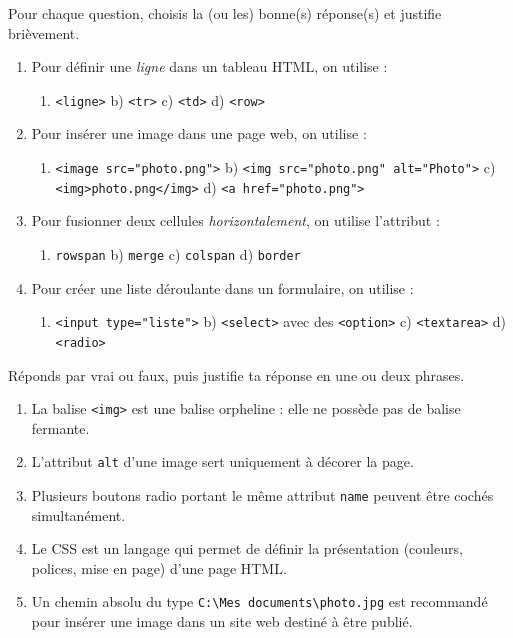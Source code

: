 \documentclass[11pt]{article}
\begin{document}
\begin{exercice}
Pour chaque question, choisis la (ou les) bonne(s) réponse(s) et justifie brièvement.
\begin{enumerate}
  \item Pour définir une \emph{ligne} dans un tableau HTML, on utilise :
  \begin{enumerate}
    \item \texttt{<ligne>} \quad b) \texttt{<tr>} \quad c) \texttt{<td>} \quad d) \texttt{<row>}
  \end{enumerate}
  \item Pour insérer une image dans une page web, on utilise :
  \begin{enumerate}
    \item \texttt{<image src="photo.png">} \quad b) \texttt{<img src="photo.png" alt="Photo">} \quad c) \texttt{<img>photo.png</img>} \quad d) \texttt{<a href="photo.png">}
  \end{enumerate}
  \item Pour fusionner deux cellules \emph{horizontalement}, on utilise l'attribut :
  \begin{enumerate}
    \item \texttt{rowspan} \quad b) \texttt{merge} \quad c) \texttt{colspan} \quad d) \texttt{border}
  \end{enumerate}
  \item Pour créer une liste déroulante dans un formulaire, on utilise :
  \begin{enumerate}
    \item \texttt{<input type="liste">} \quad b) \texttt{<select>} avec des \texttt{<option>} \quad c) \texttt{<textarea>} \quad d) \texttt{<radio>}
  \end{enumerate}
\end{enumerate}
\end{exercice}

\begin{exercice}
Réponds par vrai ou faux, puis justifie ta réponse en une ou deux phrases.
\begin{enumerate}
  \item La balise \texttt{<img>} est une balise orpheline : elle ne possède pas de balise fermante.
  \item L'attribut \texttt{alt} d'une image sert uniquement à décorer la page.
  \item Plusieurs boutons radio portant le même attribut \texttt{name} peuvent être cochés simultanément.
  \item Le CSS est un langage qui permet de définir la présentation (couleurs, polices, mise en page) d'une page HTML.
  \item Un chemin absolu du type \texttt{C:\textbackslash Mes documents\textbackslash photo.jpg} est recommandé pour insérer une image dans un site web destiné à être publié.
\end{enumerate}
\end{exercice}
\end{document}
